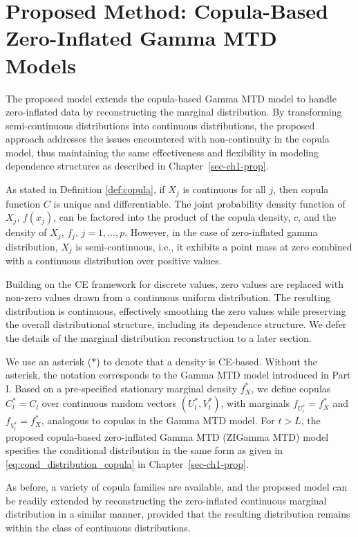 \documentclass[
  letterpaper,
  double,
  12pt,
  1.0in]{beavtex}
\begin{document}
\chapter{Proposed Method: Copula-Based Zero-Inflated Gamma MTD
Models}\label{sec-ch2-prop}

The proposed model extends the copula-based Gamma MTD model to handle
zero-inflated data by reconstructing the marginal distribution. By
transforming semi-continuous distributions into continuous
distributions, the proposed approach addresses the issues encountered
with non-continuity in the copula model, thus maintaining the same
effectiveness and flexibility in modeling dependence structures as
described in Chapter~\ref{sec-ch1-prop}.

As stated in Definition \ref{def:copula}, if \(X_j\) is continuous for
all \(j\), then copula function \(C\) is unique and differentiable. The
joint probability density function of \(X_j\), \(f(x_j)\), can be
factored into the product of the copula density, \(c\), and the density
of \(X_j\), \(f_j\), \(j=1,...,p\). However, in the case of
zero-inflated gamma distribution, \(X_j\) is semi-continuous, i.e., it
exhibits a point mass at zero combined with a continuous distribution
over positive values.

Building on the CE framework for discrete values, zero values are
replaced with non-zero values drawn from a continuous uniform
distribution. The resulting distribution is continuous, effectively
smoothing the zero values while preserving the overall distributional
structure, including its dependence structure. We defer the details of
the marginal distribution reconstruction to a later section.

We use an asterisk (\(*\)) to denote that a density is CE-based. Without
the asterisk, the notation corresponds to the Gamma MTD model introduced
in Part I. Based on a pre-specified stationary marginal density
\(f^*_X\), we define copulas \(C^*_l = C_l\) over continuous random
vectors \((U^*_l, V^*_l)\), with marginals \(f_{U^*_l} = f^*_X\) and
\(f_{V^*_l} = f^*_X\), analogous to copulas in the Gamma MTD model. For
\(t > L\), the proposed copula-based zero-inflated Gamma MTD (ZIGamma
MTD) model specifies the conditional distribution in the same form as
given in \eqref{eq:cond_distribution_copula} in
Chapter~\ref{sec-ch1-prop}.

As before, a variety of copula families are available, and the proposed
model can be readily extended by reconstructing the zero-inflated
continuous marginal distribution in a similar manner, provided that the
resulting distribution remains within the class of continuous
distributions.
\end{document}
